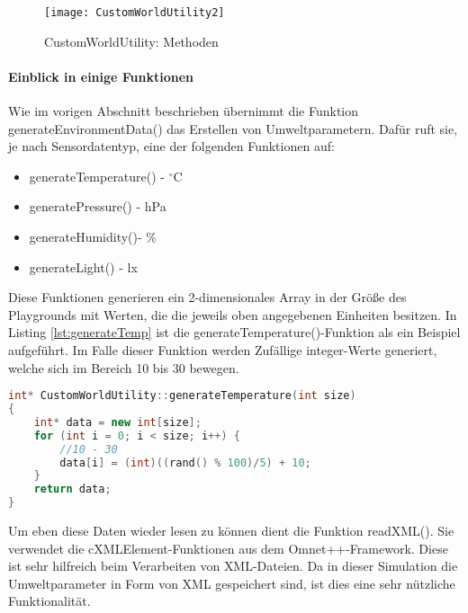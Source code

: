 \begin{figure}[htbp]
\centering
\caption{CustomWorldUtility: Methoden}
\texttt{[image: CustomWorldUtility2]}
\end{figure}

\paragraph{Einblick in einige Funktionen}

Wie im vorigen Abschnitt beschrieben übernimmt die Funktion generateEnvironmentData() das Erstellen von Umweltparametern. Dafür ruft sie, je nach Sensordatentyp, eine der folgenden Funktionen auf:

\begin{multicols}{2}
\begin{itemize}
\item generateTemperature() - $^\circ $C
\item generatePressure() - hPa
\item generateHumidity()- \%
\item generateLight() - lx
\end{itemize}
\end{multicols}

Diese Funktionen generieren ein 2-dimensionales Array in der Größe des Playgrounds mit Werten, die die jeweils oben angegebenen Einheiten besitzen. In Listing \ref{lst:generateTemp} ist die generateTemperature()-Funktion als ein Beispiel aufgeführt. Im Falle dieser Funktion werden Zufällige integer-Werte generiert, welche sich im Bereich 10 bis 30 bewegen.

\begin{lstlisting}[language=C++, label=lst:generateTemp]
int* CustomWorldUtility::generateTemperature(int size)
{
    int* data = new int[size];
    for (int i = 0; i < size; i++) {
        //10 - 30
        data[i] = (int)((rand() % 100)/5) + 10;
    }
    return data;
}
\end{lstlisting}

Um eben diese Daten wieder lesen zu können dient die Funktion readXML(). Sie verwendet die cXMLElement-Funktionen aus dem Omnet++-Framework. Diese ist sehr hilfreich beim Verarbeiten von XML-Dateien. Da in dieser Simulation die Umweltparameter in Form von XML gespeichert sind, ist dies eine sehr nützliche Funktionalität.

